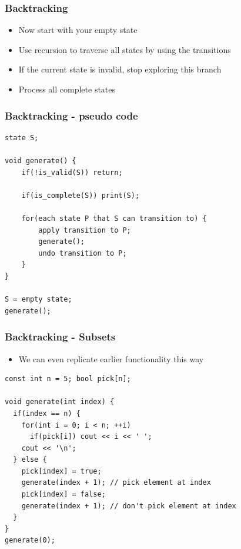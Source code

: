 \documentclass{beamer}
\begin{document}
\begin{frame}[plain]
	\frametitle{Backtracking}
	\begin{itemize}
		 \item Now start with your empty state
		 \item Use recursion to traverse all states by using the transitions
		 \item If the current state is invalid, stop exploring this branch
		 \item Process all complete states
	\end{itemize}
\end{frame}

\begin{frame}
	\frametitle{Backtracking - pseudo code}
	\begin{small}
	\begin{verbatim}
state S;

void generate() {
	if(!is_valid(S)) return;
	
	if(is_complete(S)) print(S);
	
	for(each state P that S can transition to) {
		apply transition to P;
		generate();
		undo transition to P;
	}
}

S = empty state;
generate();
	\end{verbatim}
	\end{small}
\end{frame}

\begin{frame}
	\frametitle{Backtracking - Subsets}
	\begin{itemize}
		 \item We can even replicate earlier functionality this way
	\end{itemize}
	\begin{small}
	\begin{verbatim}
const int n = 5; bool pick[n];

void generate(int index) {
  if(index == n) {
    for(int i = 0; i < n; ++i)
      if(pick[i]) cout << i << ' ';
    cout << '\n';
  } else {
    pick[index] = true;
    generate(index + 1); // pick element at index
    pick[index] = false;
    generate(index + 1); // don't pick element at index
  }
}
generate(0);
	\end{verbatim}
	\end{small}
\end{frame}
\end{document}
